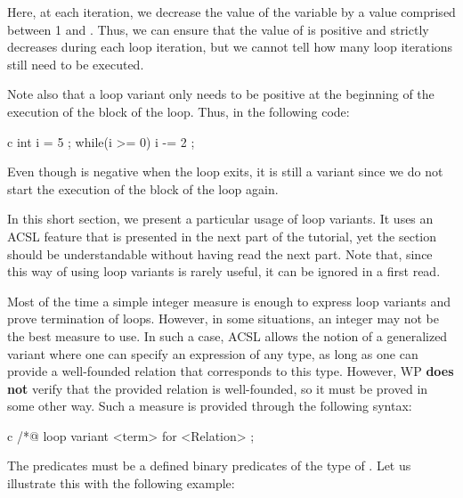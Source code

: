 

Here, at each iteration, we decrease the value of the variable  by
a value comprised between 1 and . Thus, we can ensure that the
value of  is positive and strictly decreases during each loop
iteration, but we cannot tell how many loop iterations still need to be executed.


Note also that a loop variant only needs to be positive at the beginning
of the execution of the block of the loop. Thus, in the following code:


\begin{CodeBlock}{c}
int i = 5 ;
while(i >= 0){
  i -= 2 ;
}
\end{CodeBlock}

Even though  is negative when the loop exits, it is still
a variant since we do not start the execution of the block of the loop
again.


\label{l4:statements-loops-general-measure}


\begin{Information}
  In this short section, we present a particular usage of loop variants. It uses
  an ACSL feature that is presented in the next part of the tutorial, yet the
  section should be understandable without having read the next part. Note that,
  since this way of using loop variants is rarely useful, it can be ignored in a
  first read.
\end{Information}


Most of the time a simple integer measure is enough to express loop variants
and prove termination of loops. However, in some situations, an
integer may not be the best measure to use.
In such a case, ACSL allows the notion of a generalized variant where one can
specify an expression of any type, as long as one can provide a well-founded
relation that corresponds to this type. However, WP \textbf{does not} verify that
the provided relation is well-founded, so it must be proved in some other way.
Such a measure is provided through the following syntax:


\begin{CodeBlock}{c}
/*@ loop variant <term> for <Relation> ;
\end{CodeBlock}


The  predicates must be a defined binary predicates of the
type of . Let us illustrate this with the following example:


